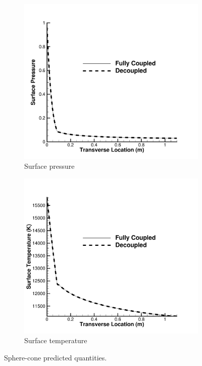 \begin{figure}
	\centering
	\begin{subfigure}[b]{0.4\textwidth}
		\centering
		\includegraphics[width=\textwidth]{figures/scitech/surface_pressure_cone}
		\caption{Surface pressure}
		\label{cone_pressure}
	\end{subfigure}
	\begin{subfigure}[b]{0.4\textwidth}
		\centering
		\includegraphics[width=\textwidth]{figures/scitech/surface_temperature_cone}
		\caption{Surface temperature}
		\label{cone_temp}
	\end{subfigure}
  \caption{ Sphere-cone predicted quantities. }
  \label{cone_predictions}
\end{figure}

